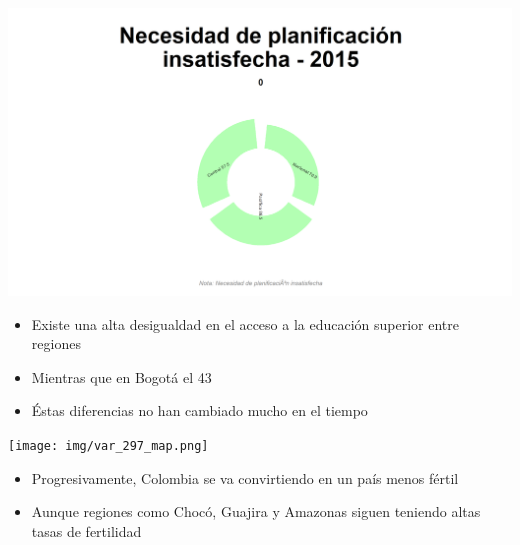 \documentclass[aspectratio=169]{beamer}
\begin{document}
    \begin{slide}{14} 
                      \begin{imagecolumn}
                \includegraphics[width=\columnwidth]{img/var_211_static.png}
            \end{imagecolumn}
            \begin{textcolumn}
                \begin{itemize}
                    \item Existe una alta desigualdad en el acceso a la educación superior entre regiones
                    \item Mientras que en Bogotá el 43%
                    \item Éstas diferencias no han cambiado mucho en el tiempo 
                \end{itemize}
            \end{textcolumn}

    \printcolumns
    \end{slide}
    
    \begin{slide}{14} 
            \begin{imagecolumn}
                \texttt{[image: img/var\_297\_map.png]}
            \end{imagecolumn}
            \begin{textcolumn}
                \begin{itemize}
                    \item Progresivamente, Colombia se va convirtiendo en un país menos fértil
                    \item Aunque regiones como Chocó, Guajira y Amazonas siguen teniendo altas tasas de fertilidad
                \end{itemize}
            \end{textcolumn}

    \printcolumns
    \end{slide}
    
\end{document}
